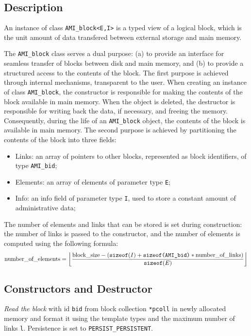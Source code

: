    \etabb

\subsection{Description}

An instance of class \lstinline|AMI_block<E,I>| is a typed
view of a logical block, which is the unit amount of data transfered
between external storage and main memory. 

The \lstinline|AMI_block| class serves a dual purpose: (a) to provide an
interface for seamless transfer of blocks between disk and main memory,
and (b) to provide a structured access to the contents of the block.
The first purpose is achieved through internal mechanisms, transparent
to the user. When creating an instance of class \lstinline|AMI_block|, the
constructor is responsible for making the contents of the block
available in main memory. When the object is deleted, the destructor is
responsible for writing back the data, if necessary, and freeing the
memory. Consequently, during the life of an \lstinline|AMI_block| object, the
contents of the block is available in main memory.
The second purpose is achieved by partitioning the contents of the block
into three fields:
\begin{itemize}
\item[] Links: an array of pointers to other blocks, represented as
block identifiers, of type \lstinline|AMI_bid|;
\item[] Elements: an array of elements of parameter type \lstinline|E|;
\item[] Info: an info field of parameter type \lstinline|I|, used to store a 
constant amount of administrative data;
\end{itemize}

The number of elements and links that can be stored is set during
construction: the number of links is passed to the constructor, and the
number of elements is computed using the following formula:
\[\mbox{\rm number\_of\_elements} = \left\lfloor\frac{\mbox{\rm
block\_size} - (\mbox{\tt sizeof}(I) + \mbox{\tt sizeof(AMI\_bid)} *
\mbox{\rm number\_of\_links})}{\mbox{\tt sizeof}(E)}\right\rfloor \]

\subsection{Constructors and Destructor}

   \btabb 

         {{\em Read the block} with id \lstinline|bid| from block collection
        \lstinline|*pcoll| in newly allocated memory and format it using the
        template types and the maximum number of links \lstinline|l|.
        Persistence is set to \lstinline|PERSIST_PERSISTENT|.}

